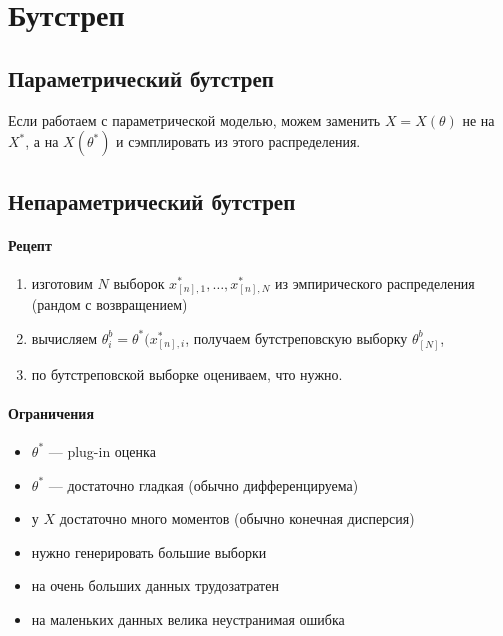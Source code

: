 \documentclass[11pt]{book}
\begin{document}
\section{Бутстреп}
\subsection{Параметрический бутстреп}
Если работаем с параметрической моделью, можем заменить $X=X(\theta)$ не на $X^*$, а на $X(\theta^*)$ и сэмплировать из этого распределения.
\subsection{Непараметрический бутстреп }
\paragraph{Рецепт}
\begin{enumerate}
	\item изготовим $N$ выборок $x^*_{[n], 1}, \ldots , x^*_{[n], N}$ из эмпирического распределения (рандом с возвращением)
	\item вычисляем $\theta^{b}_{i} = \theta^*(x^*_{[n], i}$, получаем бутстреповскую выборку $\theta^{b}_{[N]}$,
	\item по бутстреповской выборке оцениваем, что нужно.
\end{enumerate}
\paragraph{Ограничения}
\begin{itemize}
	\item $\theta^*$ --- plug-in оценка
    \item $\theta^*$ --- достаточно гладкая (обычно дифференцируема)
	\item у  $X$ достаточно много моментов (обычно конечная дисперсия)
	\item нужно генерировать большие выборки
	\item на очень больших данных трудозатратен
	\item на маленьких данных велика неустранимая ошибка
\end{itemize}
\end{document}
